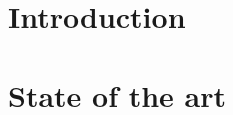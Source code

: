




\begin{refsection}


\chapter[01]{Introduction}
 \chapter[02]{State of the art}



\end{refsection}
